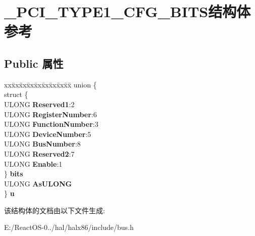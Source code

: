\hypertarget{struct___p_c_i___t_y_p_e1___c_f_g___b_i_t_s}{}\section{\+\_\+\+P\+C\+I\+\_\+\+T\+Y\+P\+E1\+\_\+\+C\+F\+G\+\_\+\+B\+I\+T\+S结构体 参考}
\label{struct___p_c_i___t_y_p_e1___c_f_g___b_i_t_s}
\subsection*{Public 属性}
\begin{DoxyCompactItemize}
\item 
\mbox{\label{struct___p_c_i___t_y_p_e1___c_f_g___b_i_t_s_afcc2bae5747cd8276e989e1034ccd5c2}} 
\begin{tabbing}
xx\=xx\=xx\=xx\=xx\=xx\=xx\=xx\=xx\=\kill
union \{\\
\>struct \{\\
\>\>ULONG {\bfseries Reserved1}:2\\
\>\>ULONG {\bfseries RegisterNumber}:6\\
\>\>ULONG {\bfseries FunctionNumber}:3\\
\>\>ULONG {\bfseries DeviceNumber}:5\\
\>\>ULONG {\bfseries BusNumber}:8\\
\>\>ULONG {\bfseries Reserved2}:7\\
\>\>ULONG {\bfseries Enable}:1\\
\>\} {\bfseries bits}\\
\>ULONG {\bfseries AsULONG}\\
\} {\bfseries u}\\

\end{tabbing}\end{DoxyCompactItemize}


该结构体的文档由以下文件生成\+:\begin{DoxyCompactItemize}
\item 
E\+:/\+React\+O\+S-\/0../hal/halx86/include/bus.\+h\end{DoxyCompactItemize}
